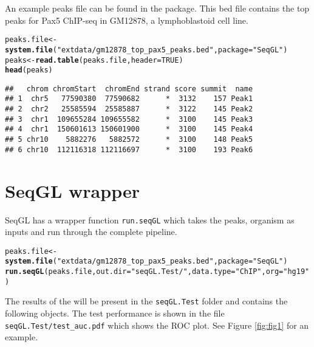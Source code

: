 \documentclass[10pt,oneside]{article}\usepackage[]{graphicx}\usepackage[]{color}
\makeatletter
\newcommand{\hlnum}[1]{\textcolor[rgb]{0.686,0.059,0.569}{#1}}%
\newcommand{\hlstr}[1]{\textcolor[rgb]{0.192,0.494,0.8}{#1}}%
\newcommand{\hlstd}[1]{\textcolor[rgb]{0.345,0.345,0.345}{#1}}%
\newcommand{\hlkwb}[1]{\textcolor[rgb]{0.69,0.353,0.396}{#1}}%
\newcommand{\hlkwc}[1]{\textcolor[rgb]{0.333,0.667,0.333}{#1}}%
\newcommand{\hlkwd}[1]{\textcolor[rgb]{0.737,0.353,0.396}{\textbf{#1}}}%
\newenvironment{kframe}{%
 \def\at@end@of@kframe{}%
 \ifinner\ifhmode%
  \def\at@end@of@kframe{\end{minipage}}%
  \begin{minipage}{\columnwidth}%
 \fi\fi%
 \def\FrameCommand##1{\hskip\@totalleftmargin \hskip-\fboxsep
 \colorbox{shadecolor}{##1}\hskip-\fboxsep
     \hskip-\linewidth \hskip-\@totalleftmargin \hskip\columnwidth}%
 \MakeFramed {\advance\hsize-\width
   \@totalleftmargin\z@ \linewidth\hsize
   \@setminipage}}%
 {\par\unskip\endMakeFramed%
 \at@end@of@kframe}
\newenvironment{knitrout}{}{} %
\makeatother
\begin{document}
An example peaks file can be found in the package. This bed file contains the top peaks for Pax5 ChIP-seq in GM12878, a lymphoblastoid cell line.
\begin{knitrout}
\color{fgcolor}\begin{kframe}
\begin{alltt}
\hlstd{peaks.file} \hlkwb{<-} \hlkwd{system.file}\hlstd{(}\hlstr{"extdata/gm12878_top_pax5_peaks.bed"}\hlstd{,} \hlkwc{package} \hlstd{=} \hlstr{"SeqGL"}\hlstd{)}
\hlstd{peaks} \hlkwb{<-} \hlkwd{read.table}\hlstd{(peaks.file,} \hlkwc{header} \hlstd{=} \hlnum{TRUE}\hlstd{)}
\hlkwd{head}\hlstd{(peaks)}
\end{alltt}
\begin{verbatim}
##   chrom chromStart  chromEnd strand score summit  name
## 1  chr5   77590380  77590682      *  3132    157 Peak1
## 2  chr2   25585594  25585887      *  3122    145 Peak2
## 3  chr1  109655284 109655582      *  3100    145 Peak3
## 4  chr1  150601613 150601900      *  3100    145 Peak4
## 5 chr10    5882276   5882572      *  3100    148 Peak5
## 6 chr10  112116318 112116697      *  3100    193 Peak6
\end{verbatim}
\end{kframe}
\end{knitrout}



\section{SeqGL wrapper}
SeqGL has a wrapper function \texttt{run.seqGL} which takes the peaks, organism as inputs and run through the complete pipeline.
\begin{knitrout}
\color{fgcolor}\begin{kframe}
\begin{alltt}
\hlstd{peaks.file} \hlkwb{<-} \hlkwd{system.file}\hlstd{(}\hlstr{"extdata/gm12878_top_pax5_peaks.bed"}\hlstd{,} \hlkwc{package} \hlstd{=} \hlstr{"SeqGL"}\hlstd{)}
\hlkwd{run.seqGL}\hlstd{(peaks.file,} \hlkwc{out.dir} \hlstd{=} \hlstr{"seqGL.Test/"}\hlstd{,} \hlkwc{data.type} \hlstd{=} \hlstr{"ChIP"}\hlstd{,} \hlkwc{org} \hlstd{=} \hlstr{"hg19"}\hlstd{)}
\end{alltt}
\end{kframe}
\end{knitrout}


The results of the will be present in the \texttt{seqGL.Test} folder and contains the following objects. 
The test performance is shown in the file \texttt{seqGL.Test/test\_auc.pdf} which shows the ROC plot. See Figure \ref{fig:fig1} for an example.
\end{document}
